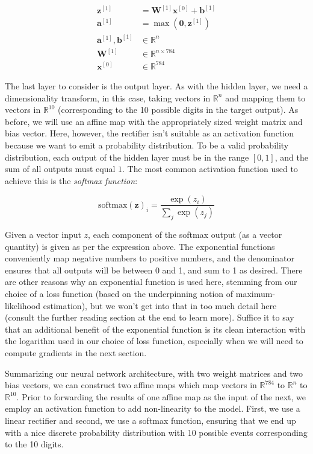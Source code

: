 \documentclass[
]{article}
\begin{document}
\[
\begin{aligned}
\mathbf{z}^{[1]} &= \mathbf{W}^{[1]}\mathbf{x}^{[0]} + \mathbf{b}^{[1]} \\
\mathbf{a}^{[1]} &= \max(\mathbf{0}, \mathbf{z}^{[1]}) \\
\mathbf{a}^{[1]}, \mathbf{b}^{[1]} &\in \mathbb{R}^n \\
\mathbf{W}^{[1]} &\in \mathbb{R}^{n\times 784} \\
\mathbf{x}^{[0]} &\in \mathbb{R}^{784}
\end{aligned}
\]

The last layer to consider is the output layer. As with the hidden
layer, we need a dimensionality transform, in this case, taking vectors
in \(\mathbb{R}^n\) and mapping them to vectors in \(\mathbb{R}^{10}\)
(corresponding to the 10 possible digits in the target output). As
before, we will use an affine map with the appropriately sized weight
matrix and bias vector. Here, however, the rectifier isn't suitable as
an activation function because we want to emit a probability
distribution. To be a valid probability distribution, each output of the
hidden layer must be in the range \([0, 1]\), and the sum of all outputs
must equal \(1\). The most common activation function used to achieve
this is the \emph{softmax function}:

\[\mathrm{softmax}(\mathbf{z})_i = \frac{\exp(z_i)}{\sum_j \exp(z_j)}\]

Given a vector input \(z\), each component of the softmax output (as a
vector quantity) is given as per the expression above. The exponential
functions conveniently map negative numbers to positive numbers, and the
denominator ensures that all outputs will be between 0 and 1, and sum to
1 as desired. There are other reasons why an exponential function is
used here, stemming from our choice of a loss function (based on the
underpinning notion of maximum-likelihood estimation), but we won't get
into that in too much detail here (consult the further reading section
at the end to learn more). Suffice it to say that an additional benefit
of the exponential function is its clean interaction with the logarithm
used in our choice of loss function, especially when we will need to
compute gradients in the next section.

Summarizing our neural network architecture, with two weight matrices
and two bias vectors, we can construct two affine maps which map vectors
in \(\mathbb{R}^{784}\) to \(\mathbb{R}^n\) to \(\mathbb{R}^{10}\).
Prior to forwarding the results of one affine map as the input of the
next, we employ an activation function to add non-linearity to the
model. First, we use a linear rectifier and second, we use a softmax
function, ensuring that we end up with a nice discrete probability
distribution with 10 possible events corresponding to the 10 digits.
\end{document}
